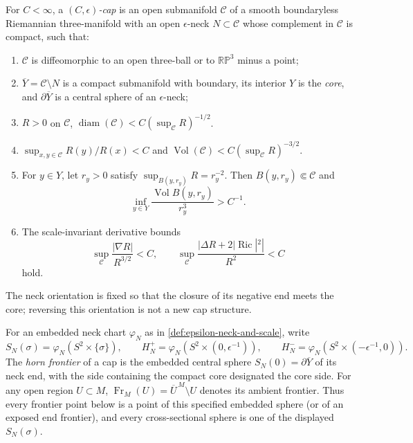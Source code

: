 \begin{definition}
\label{def:canonical-cap}
\notready
For $C<\infty$, a \emph{$(C,\epsilon)$-cap} is an open submanifold
$\mathcal C$ of a smooth boundaryless Riemannian three-manifold with an open
$\epsilon$-neck $N\subset\mathcal C$ whose complement in $\mathcal C$ is
compact, such that:
\begin{enumerate}
\item $\mathcal C$ is diffeomorphic to an open three-ball or to
      $\mathbb{RP}^3$ minus a point;
\item $\overline Y=\mathcal C\setminus N$ is a compact submanifold with
      boundary, its interior $Y$ is the \emph{core}, and
      $\partial\overline Y$ is a central sphere of an $\epsilon$-neck;
\item $R>0$ on $\mathcal C$,
      $\operatorname{diam}(\mathcal C)
       <C(\sup_{\mathcal C}R)^{-1/2}$.
\item $\sup_{x,y\in\mathcal C}R(y)/R(x)<C$ and
      $\operatorname{Vol}(\mathcal C)
      <C(\sup_{\mathcal C}R)^{-3/2}$.
\item For $y\in Y$, let $r_y>0$ satisfy
      $\sup_{B(y,r_y)}R=r_y^{-2}$.  Then
      $B(y,r_y)\Subset\mathcal C$ and
      \[
       \inf_{y\in Y}\frac{\operatorname{Vol}B(y,r_y)}{r_y^3}>C^{-1}.
      \]
\item The scale-invariant derivative bounds
      \[
       \sup_{\mathcal C}\frac{|\nabla R|}{R^{3/2}}<C,
       \qquad
       \sup_{\mathcal C}
       \frac{|\Delta R+2|\operatorname{Ric}|^2|}{R^2}<C
      \]
      hold.
\end{enumerate}
The neck orientation is fixed so that the closure of its negative end meets
the core; reversing this orientation is not a new cap structure.
\end{definition}

\begin{definition}
\label{def:embedded-horn-frontier}
\notready
For an embedded neck chart $\varphi_N$ as in
\ref{def:epsilon-neck-and-scale}, write
\[
 S_N(\sigma)=\varphi_N(S^2\times\{\sigma\}),\qquad
 H_N^+=\varphi_N(S^2\times(0,\epsilon^{-1})),\qquad
 H_N^-=\varphi_N(S^2\times(-\epsilon^{-1},0)).
\]
The \emph{horn frontier} of a cap is the embedded central sphere
$S_N(0)=\partial\overline Y$ of its neck end, with the side containing the
compact core designated the core side.  For any open region $U\subset M$,
\(\operatorname{Fr}_M(U)=\overline U^{\,M}\setminus U\) denotes its ambient
frontier.  Thus every frontier point below is a point of this specified
embedded sphere (or of an exposed end frontier), and every
cross-sectional sphere is one of the displayed $S_N(\sigma)$.
\end{definition}

